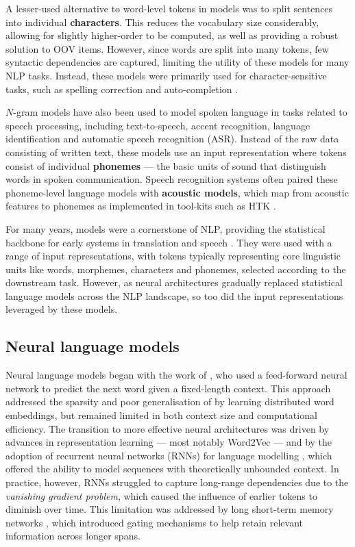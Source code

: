 A lesser-used alternative to word-level tokens in \ngram models was to split sentences into individual \textbf{characters}. This reduces the vocabulary size considerably, allowing for slightly higher-order \ngrams to be computed, as well as providing a robust solution to OOV items. However, since words are split into many tokens, few syntactic dependencies are captured, limiting the utility of these models for many NLP tasks. Instead, these models were primarily used for character-sensitive tasks, such as spelling correction and auto-completion \citep{cucerzan_spelling_2004}.

$N$-gram models have also been used to model spoken language in tasks related to speech processing, including text-to-speech, accent recognition, language identification and automatic speech recognition (ASR). Instead of the raw data consisting of written text, these models use an input representation where tokens consist of individual \textbf{phonemes} --- the basic units of sound that distinguish words in spoken communication. Speech recognition systems often paired these phoneme-level language models with \textbf{acoustic models}, which map from acoustic features to phonemes as implemented in tool-kits such as HTK \citep{young2006htk}.

For many years, \ngram models were a cornerstone of NLP, providing the statistical backbone for early systems in translation and speech \citep{jurafsky2009speech}. They were used with a range of input representations, with tokens typically representing core linguistic units like words, morphemes, characters and phonemes, selected according to the downstream task. However, as neural architectures gradually replaced statistical language models across the NLP landscape, so too did the input representations leveraged by these models.

\subsection{Neural language models}

Neural language models began with the work of \citet{bengio2000neural}, who used a feed-forward neural network to predict the next word given a fixed-length context. This approach addressed the sparsity and poor generalisation of \ngrams by learning distributed word embeddings, but remained limited in both context size and computational efficiency. The transition to more effective neural architectures was driven by advances in representation learning --- most notably Word2Vec \citep{mikolov_distributed_2013} --- and by the adoption of recurrent neural networks (RNNs) for language modelling \citep[RNNLMs;][]{mikolov2010recurrent}, which offered the ability to model sequences with theoretically unbounded context. In practice, however, RNNs struggled to capture long-range dependencies due to the \emph{vanishing gradient problem}, which caused the influence of earlier tokens to diminish over time. This limitation was addressed by long short-term memory networks \citep[LSTMs;][]{sundermeyer2012lstm}, which introduced gating mechanisms to help retain relevant information across longer spans. 

